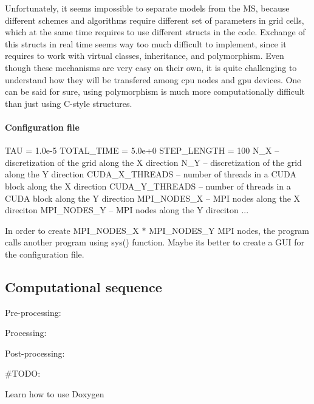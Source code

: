 Unfortunately, it seems impossible to separate models from the MS, because different schemes and algorithms require different set of parameters in grid cells, which at the same time requires to use different structs in the code. Exchange of this structs in real time seems way too much difficult to implement, since it requires to work with virtual classes, inheritance, and polymorphism. Even though these mechanisms are very easy on their own, it is quite challenging to understand how they will be transfered among cpu nodes and gpu devices. One can be said for sure, using polymorphism is much more computationally difficult than just using C-\/style structures.

\paragraph*{Configuration file}


\begin{DoxyCode}
TAU = 1.0e-5 %
TOTAL\_TIME = 5.0e+0 %
STEP\_LENGTH = 100 %
N\_X -- discretization of the grid along the X direction
N\_Y -- discretization of the grid along the Y direction
CUDA\_X\_THREADS -- number of threads in a CUDA block along the X direction
CUDA\_Y\_THREADS -- number of threads in a CUDA block along the Y direction
MPI\_NODES\_X -- MPI nodes along the X direciton
MPI\_NODES\_Y -- MPI nodes along the Y direciton
...
\end{DoxyCode}
 In order to create {\ttfamily M\+P\+I\+\_\+\+N\+O\+D\+E\+S\+\_\+X $\ast$ M\+P\+I\+\_\+\+N\+O\+D\+E\+S\+\_\+Y} M\+PI nodes, the program calls another program using {\ttfamily sys()} function. Maybe it\textquotesingle{}s better to create a G\+UI for the configuration file.

\subsection*{Computational sequence}


\begin{DoxyEnumerate}
\item Pre-\/processing\+:
\item Processing\+:
\item Post-\/processing\+:
\end{DoxyEnumerate}

\#\+T\+O\+DO\+:
\begin{DoxyItemize}
\item Learn how to use Doxygen 
\end{DoxyItemize}